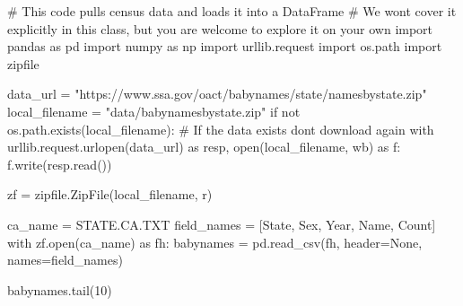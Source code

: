 \documentclass[
  letterpaper,
  DIV=11,
  numbers=noendperiod]{scrreprt}
\newenvironment{Shaded}{\begin{snugshade}}{\end{snugshade}}
\newcommand{\BuiltInTok}[1]{\textcolor[rgb]{0.00,0.23,0.31}{#1}}
\newcommand{\CommentTok}[1]{\textcolor[rgb]{0.37,0.37,0.37}{#1}}
\newcommand{\ControlFlowTok}[1]{\textcolor[rgb]{0.00,0.23,0.31}{#1}}
\newcommand{\DecValTok}[1]{\textcolor[rgb]{0.68,0.00,0.00}{#1}}
\newcommand{\ImportTok}[1]{\textcolor[rgb]{0.00,0.46,0.62}{#1}}
\newcommand{\KeywordTok}[1]{\textcolor[rgb]{0.00,0.23,0.31}{#1}}
\newcommand{\NormalTok}[1]{\textcolor[rgb]{0.00,0.23,0.31}{#1}}
\newcommand{\OperatorTok}[1]{\textcolor[rgb]{0.37,0.37,0.37}{#1}}
\newcommand{\StringTok}[1]{\textcolor[rgb]{0.13,0.47,0.30}{#1}}
\newcommand{\VariableTok}[1]{\textcolor[rgb]{0.07,0.07,0.07}{#1}}
\begin{document}
\begin{Shaded}
\begin{Highlighting}[]
\CommentTok{\# This code pulls census data and loads it into a DataFrame}
\CommentTok{\# We won\textquotesingle{}t cover it explicitly in this class, but you are welcome to explore it on your own}
\ImportTok{import}\NormalTok{ pandas }\ImportTok{as}\NormalTok{ pd}
\ImportTok{import}\NormalTok{ numpy }\ImportTok{as}\NormalTok{ np}
\ImportTok{import}\NormalTok{ urllib.request}
\ImportTok{import}\NormalTok{ os.path}
\ImportTok{import}\NormalTok{ zipfile}

\NormalTok{data\_url }\OperatorTok{=} \StringTok{"https://www.ssa.gov/oact/babynames/state/namesbystate.zip"}
\NormalTok{local\_filename }\OperatorTok{=} \StringTok{"data/babynamesbystate.zip"}
\ControlFlowTok{if} \KeywordTok{not}\NormalTok{ os.path.exists(local\_filename): }\CommentTok{\# If the data exists don\textquotesingle{}t download again}
    \ControlFlowTok{with}\NormalTok{ urllib.request.urlopen(data\_url) }\ImportTok{as}\NormalTok{ resp, }\BuiltInTok{open}\NormalTok{(local\_filename, }\StringTok{\textquotesingle{}wb\textquotesingle{}}\NormalTok{) }\ImportTok{as}\NormalTok{ f:}
\NormalTok{        f.write(resp.read())}

\NormalTok{zf }\OperatorTok{=}\NormalTok{ zipfile.ZipFile(local\_filename, }\StringTok{\textquotesingle{}r\textquotesingle{}}\NormalTok{)}

\NormalTok{ca\_name }\OperatorTok{=} \StringTok{\textquotesingle{}STATE.CA.TXT\textquotesingle{}}
\NormalTok{field\_names }\OperatorTok{=}\NormalTok{ [}\StringTok{\textquotesingle{}State\textquotesingle{}}\NormalTok{, }\StringTok{\textquotesingle{}Sex\textquotesingle{}}\NormalTok{, }\StringTok{\textquotesingle{}Year\textquotesingle{}}\NormalTok{, }\StringTok{\textquotesingle{}Name\textquotesingle{}}\NormalTok{, }\StringTok{\textquotesingle{}Count\textquotesingle{}}\NormalTok{]}
\ControlFlowTok{with}\NormalTok{ zf.}\BuiltInTok{open}\NormalTok{(ca\_name) }\ImportTok{as}\NormalTok{ fh:}
\NormalTok{    babynames }\OperatorTok{=}\NormalTok{ pd.read\_csv(fh, header}\OperatorTok{=}\VariableTok{None}\NormalTok{, names}\OperatorTok{=}\NormalTok{field\_names)}

\NormalTok{babynames.tail(}\DecValTok{10}\NormalTok{)}
\end{Highlighting}
\end{Shaded}
\end{document}

